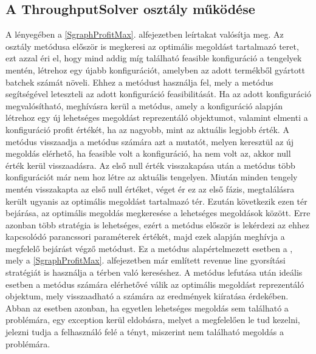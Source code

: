 \subsection{A ThroughputSolver osztály működése} \label{throughput_solver}
A  lényegében a \ref{SgraphProfitMax}. alfejezetben leírtakat valósítja meg.
Az osztály  metódusa először is megkeresi az optimális megoldást tartalmazó teret, ezt azzal éri el, hogy mind addig míg található feasible konfiguráció a tengelyek mentén, létrehoz egy újabb konfigurációt, amelyben az adott termékből gyártott batchek számát növeli.
Ehhez a  metódust használja fel, mely a  metódus segítségével leteszteli az adott konfiguráció feasibilitását.
Ha az adott konfiguráció megvalósítható, meghívásra kerül a  metódus, amely a konfiguráció alapján létrehoz egy új lehetséges megoldást reprezentáló objektumot, valamint elmenti a konfiguráció profit értékét, ha az nagyobb, mint az aktuális legjobb érték.
A  metódus visszaadja a  metódus számára azt a mutatót, melyen keresztül az új megoldás elérhető, ha feasible volt a konfiguráció, ha nem volt az, akkor null érték kerül visszaadásra.
Az első null érték visszakapása után a  metódus több konfigurációt már nem hoz létre az aktuális tengelyen.
Miután minden tengely mentén visszakapta az első null értéket, véget ér ez az első fázis, megtalálásra került ugyanis az optimális megoldást tartalmazó tér.
Ezután következik ezen tér bejárása, az optimális megoldás megkeresése a lehetséges megoldások között.
Erre azonban több stratégia is lehetséges, ezért a  metódus először is lekérdezi az ehhez kapcsolódó parancssori paraméterek értékét, majd ezek alapján meghívja a megfelelő bejárást végző metódust.
Ez a metódus alapértelmezett esetben a , mely a \ref{SgraphProfitMax}. alfejezetben már említett revenue line gyorsítási stratégiát is használja a térben való kereséshez.
A metódus lefutása után ideális esetben a  metódus számára elérhetővé válik az optimális megoldást reprezentáló objektum, mely visszaadható a  számára az eredmények kiíratása érdekében.
Abban az esetben azonban, ha egyetlen lehetséges megoldás sem található a problémára, egy exception kerül eldobásra, melyet a  megfelelően le tud kezelni, jelezni tudja a felhasználó felé a tényt, miszerint nem található megoldás a problémára.